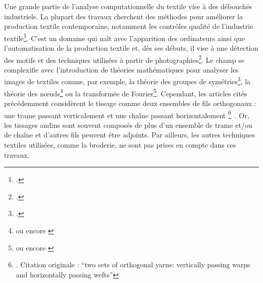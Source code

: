 Une grande partie de l'analyse computationnelle du textile vise à des débouchés industriels. La plupart des travaux cherchent des méthodes pour améliorer la production textile contemporaine, notamment les contrôles qualité de l'industrie textile\footcite[p.~6346]{mengAutomaticRecognitionWoven2022}. C'est un domaine qui naît avec l'apparition des ordinateurs ainsi que l'automatisation de la production textile et, dès ses débuts, il vise à une détection des motifs et des techniques utilisées à partir de photographies\footcite{kangAutomaticRecognitionFabric1999}. Le champ se complexifie avec l'introduction de théories mathématiques pour analyser les images de textiles comme, par exemple, la théorie des groupes de symétries\footcite{valienteStructuralDescriptionTextile2004}, la théorie des n\oe{}uds\footnote{\cite{grishanovTopologicalStudyTextile2009} ou encore \cite{helmerSimilarityMeasureWeaving2018}} ou la transformée de Fourier\footnote{\cite{zhengAccurateIndexingClassification2009} ou encore \cite{zhangWeavePatternRecognition2017}}. Cependant, les articles cités précédemment considèrent le tissage comme  \og deux ensembles de fils orthogonaux : une trame passant verticalement et une chaîne passant horizontalement \footnote{\cite[p.~6345]{mengAutomaticRecognitionWoven2022}. Citation originale :  \textquotedblleft two sets of orthogonal yarns: vertically passing warps and horizontally passing wefts\textquotedblright}~\fg. Or, les tissages andins sont souvent composés de plus d'un ensemble de trame et/ou de chaîne et d'autres fils peuvent être adjoints. Par ailleurs, les autres techniques textiles utilisées, comme la broderie, ne sont pas prises en compte dans ces travaux. 


